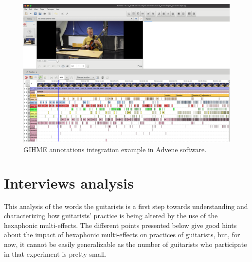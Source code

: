\documentclass{article}
\begin{document}
\begin{figure}
    \centering
    \includegraphics[width=\columnwidth]{figures/IvannCruz_2_3_1_Advene.png}
    \caption{GIHME annotations integration example in Advene software.}
    \label{fig:Ivann-2_4-advene}
\end{figure}


    
    


\section{Interviews analysis}
\label{sec:analysis}

This analysis of the words the guitarists is a first step towards understanding and characterizing how guitarists' practice is being altered by the use of the hexaphonic multi-effects.  
The different points presented below give good hints about the impact of hexaphonic multi-effects on practices of guitarists, but, for now, it cannot be easily generalizable as the number of guitarists who participate in that experiment is pretty small.
\end{document}
